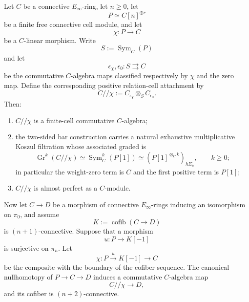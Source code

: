 \begin{lemma}
\label{lem:bnla-positive-relation-cell}
Let $C$ be a connective $E_\infty$-ring, let $n\geq0$, let
\[
    P\simeq C[n]^{\oplus r}
\]
be a finite free connective cell module, and let
\[
    \chi:P\longrightarrow C
\]
be a $C$-linear morphism.  Write
\[
    S:=\operatorname{Sym}_C(P)
\]
and let
\[
    \epsilon_\chi,\epsilon_0:S\rightrightarrows C
\]
be the commutative $C$-algebra maps classified respectively by $\chi$ and the
zero map.  Define the corresponding positive relation-cell attachment by
\[
\boxed{
    C//\chi
    :=
    C_{\epsilon_\chi}\otimes_S C_{\epsilon_0}.}
\]
Then:
\begin{enumerate}
    \item $C//\chi$ is a finite-cell commutative $C$-algebra;
    \item the two-sided bar construction carries a natural exhaustive
    multiplicative Koszul filtration whose associated graded is
    \[
    \boxed{
        \operatorname{Gr}^k(C//\chi)
        \simeq
        \operatorname{Sym}^k_C(P[1])
        \simeq
        \left(P[1]^{\otimes_C k}\right)_{h\Sigma_k},
        \qquad k\geq0;}
    \]
    in particular the weight-zero term is $C$ and the first positive term is
    $P[1]$;
    \item $C//\chi$ is almost perfect as a $C$-module.
\end{enumerate}

Now let $C\to D$ be a morphism of connective $E_\infty$-rings inducing an
isomorphism on $\pi_0$, and assume
\[
    K:=\operatorname{cofib}(C\to D)
\]
is $(n+1)$-connective.  Suppose that a morphism
\[
    u:P\longrightarrow K[-1]
\]
is surjective on $\pi_n$.  Let
\[
    \chi:
    P\xrightarrow{u}K[-1]\longrightarrow C
\]
be the composite with the boundary of the cofiber sequence.  The canonical
nullhomotopy of $P\to C\to D$ induces a commutative $C$-algebra map
\[
    C//\chi\longrightarrow D,
\]
and its cofiber is $(n+2)$-connective.
\end{lemma}

